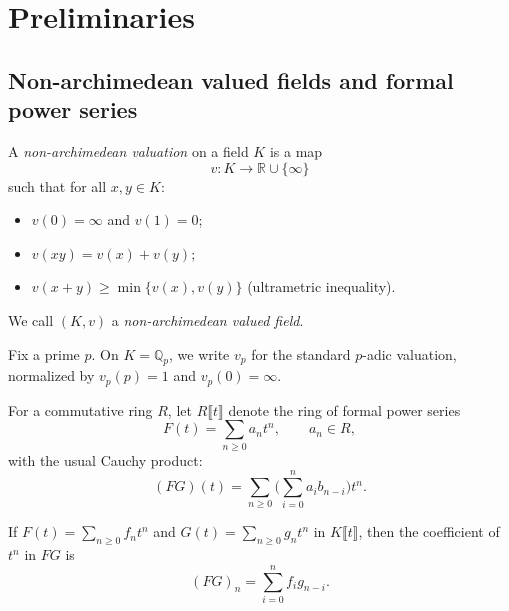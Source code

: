 \section{Preliminaries}

\subsection{Non-archimedean valued fields and formal power series}

\begin{definition}
  \label{def:nonarch_valuation}
  
  A \emph{non-archimedean valuation} on a field $K$ is a map
  \[
    v : K \to \mathbb{R}\cup\{\infty\}
  \]
  such that for all $x,y\in K$:
  \begin{itemize}
    \item $v(0)=\infty$ and $v(1)=0$;
    \item $v(xy)=v(x)+v(y)$;
    \item $v(x+y)\ge \min\{v(x),v(y)\}$ (ultrametric inequality).
  \end{itemize}
  We call $(K,v)$ a \emph{non-archimedean valued field}.
\end{definition}

\begin{definition}
  \label{def:vp_Qp}
  
  \leanok
  
  
  Fix a prime $p$. On $K=\mathbb{Q}_p$, we write $v_p$ for the standard $p$-adic valuation,
  normalized by $v_p(p)=1$ and $v_p(0)=\infty$.
\end{definition}

\begin{definition}
  \label{def:fps_ring}
  
  \uses{}
  \leanok
  For a commutative ring $R$, let $R\llbracket t\rrbracket$ denote the ring of formal power series
  \[
    F(t)=\sum_{n\ge 0} a_n t^n,\qquad a_n\in R,
  \]
  with the usual Cauchy product:
  \[
    (FG)(t)=\sum_{n\ge 0}\Big(\sum_{i=0}^n a_i b_{n-i}\Big)t^n.
  \]
\end{definition}

\begin{lemma}
  \label{lem:coeff_mul}
  
  \leanok
  
  
  If $F(t)=\sum_{n\ge 0} f_n t^n$ and $G(t)=\sum_{n\ge 0} g_n t^n$ in $K\llbracket t\rrbracket$, then
  the coefficient of $t^n$ in $FG$ is
  \[
    (FG)_n = \sum_{i=0}^n f_i g_{n-i}.
  \]
\end{lemma}


